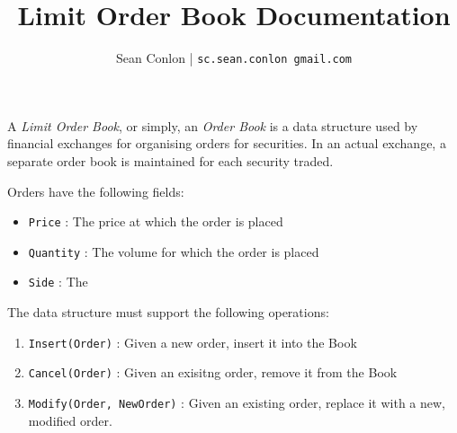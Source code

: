 

\title{Limit Order Book Documentation}

\author{Sean Conlon | \texttt{sc.sean.conlon \@ gmail.com}}

A \textit{Limit Order Book}, or simply, an \textit{Order Book} is a data structure used by
financial exchanges for organising orders for securities. In an actual exchange, a separate order
book is maintained for each security traded. 

Orders have the following fields: 
\begin{itemize}
    \item \texttt{Price} : The price at which the order is placed
    \item \texttt{Quantity} : The volume for which the order is placed
    \item \texttt{Side} : The \tex
\end{itemize}

The data structure must support the following operations:

\begin{enumerate}
    \item \texttt{Insert(Order)} : Given a new order, insert it into the Book
    \item \texttt{Cancel(Order)} : Given an exisitng order, remove it from the Book
    \item \texttt{Modify(Order, NewOrder)} : Given an existing order, replace it with a new, modified order.
\end{enumerate}








